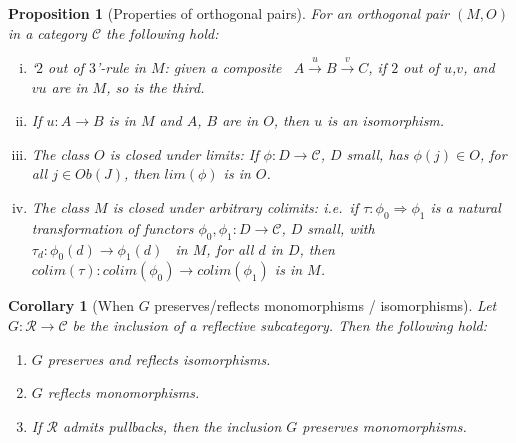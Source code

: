 \documentclass [12pt,oneside]{book}%
\theoremstyle{captionstyle}  %
\newtheorem{proposition}[theorem]{Proposition}
\newtheorem{corollary}[theorem]{Corollary}
\newcommand{\from}{\colon}				%
\newcommand{\Objcts}[1]{\mathit{Ob}(#1)}	%
\newcommand{\CoLimOf}[1]{\textit{colim}\left(#1\right)}		%
\newcommand{\LimOf}[1]{\textit{lim}\left(#1\right)}        			%
\begin{document}
\begin{proposition}[Properties of orthogonal pairs]
    \label{thm:OrthogonalPairs-Props}
    For an orthogonal pair $(M,O)$ in a category $\mathcal{C}$ the following hold:
    \begin{enumerate}[(i)]
        \item \label{thm:OrthogonalPairProps,2of3M}%
              `$2$ out of $3$'-rule in $M$: given a composite \ $A \overset{u}{\longrightarrow} B \overset{v}{\longrightarrow} C$, if $2$ out of $u$,$v$, and $vu$ are in $M$, so is the third.
        \item \label{thm:OrthogonalPairProps,IsoTest}%
              If $u\from A\to B$ is in $M$ and $A$, $B$ are in $O$, then $u$ is an isomorphism.
        \item \label{thm:OrthogonalPairProps,LclsClsdLmts}%
              The class $O$ is closed under limits: If $\phi\from D\to \mathcal{C}$, $D$ small, has $\phi(j)\in O$, for all $j\in \Objcts{J}$, then $\LimOf{\phi}$ is in $O$.
        \item \label{thm:OrthgnlPrPrprts,EqvlncsClsdCLmts}%
              The class $M$ is closed under arbitrary colimits: i.e.\ if $\tau\from \phi_0\Rightarrow \phi_1$ is a natural transformation of functors $\phi_0,\phi_1\from D\to \mathcal{C}$, $D$ small, with \ $\tau_d\from \phi_0(d)\to \phi_1(d)$ \ in $M$, for all $d$ in $D$, then $\CoLimOf{\tau}\from \CoLimOf{\phi_0}\to \CoLimOf{\phi_1}$ is in $M$.
    \end{enumerate}
\end{proposition}

\begin{corollary}[When $G$ preserves/reflects monomorphisms / isomorphisms]
    \label{thm:ReflectiveSubCatInclusion-Monos/Isos}
    Let $G\from \mathcal{R}\to \mathcal{C}$ be the inclusion of a reflective subcategory. Then the following hold:
    \begin{enumerate}
        \item $G$ preserves and reflects isomorphisms.
        \item $G$ reflects monomorphisms.
        \item If $\mathcal{R}$ admits pullbacks, then the inclusion $G$ preserves monomorphisms.
    \end{enumerate}
\end{corollary}
\end{document}
